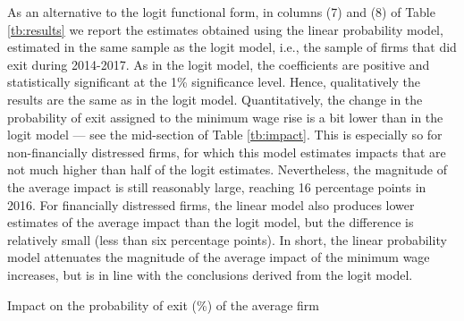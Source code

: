 \documentclass[12pt]{article}
\begin{document}


As an alternative to the logit functional form, in columns (7) and (8) of Table \ref{tb:results} we report the estimates obtained using the linear probability model, estimated in the same sample as the logit model, i.e., the sample of firms that did exit during 2014-2017. 
As in the logit model, the coefficients are positive and statistically significant at the 1\% significance level. 
Hence, qualitatively the results are the same as in the logit model. 
Quantitatively, the change in the probability of exit assigned to the minimum wage rise is a bit lower than in the logit model --- see the mid-section of Table \ref{tb:impact}. 
This is especially so for non-financially distressed firms, for which this model estimates impacts that are not much higher than half of the logit estimates. 
Nevertheless, the magnitude of the average impact is still reasonably large, reaching 16 percentage points in 2016. 
For financially distressed firms, the linear model also produces lower estimates of the average impact than the logit model, but the difference is relatively small (less than six percentage points). 
In short, the linear probability model attenuates the magnitude of the average impact of the minimum wage increases, but is in line with the conclusions derived from the logit model. 


\begin{table}[ht]
\caption{Impact on the probability of exit (\%) of the average firm}\label{tb:impact}
    \begin{center}
    {}
    \end{center}
\end{table}
\end{document}
